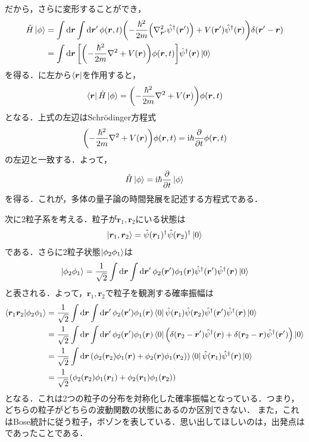 \documentclass{report}
\begin{document}
だから，さらに変形することができ，
\begin{align}
  \hat{H}\ket{\phi} &= \int \dd{\bm{r}} \int \dd{\bm{r}'} \phi(\bm{r},t) \qty(-\frac{\hbar^2}{2m}\qty(\nabla_{\bm{r}'}^2\hat{\psi}^{\dagger}(\bm{r}')) + V(\bm{r}')\hat{\psi}^{\dagger}(\bm{r}))\delta(\bm{r}' - \bm{r})\\
  &= \int \dd{\bm{r}} \qty[\qty(-\frac{\hbar^2}{2m}\nabla^2 + V(\bm{r}))\phi(\bm{r},t)]\hat{\psi}^{\dagger}(\bm{r})\ket{0} \label{integral-of-state}
\end{align}
を得る．に左から$\bra{\bm{r}}$を作用すると，
\begin{align}
  \bra{\bm{r}}\hat{H}\ket{\phi} = \qty(-\frac{\hbar^2}{2m}\nabla^2 + V(\bm{r}))\phi(\bm{r},t)
\end{align}
となる．上式の左辺はSchrödinger方程式
\begin{align}
  \qty(-\frac{\hbar^2}{2m}\nabla^2 + V(\bm{r}))\phi(\bm{r},t) = \mathrm{i}\hbar\frac{\partial}{\partial t}\phi(\bm{r},t)
\end{align}
の左辺と一致する．よって，
\begin{align}
  \hat{H} \ket{\phi} = \mathrm{i}\hbar\frac{\partial}{\partial t}\ket{\phi}
\end{align}
を得る．これが，多体の量子論の時間発展を記述する方程式である．

次に2粒子系を考える．粒子が$\bm{r}_1,\bm{r}_2$にいる状態は
\begin{align}
  \ket{\bm{r}_1,\bm{r}_2} = \hat{\psi}(\bm{r}_1)^{\dagger}\hat{\psi}(\bm{r}_2)^{\dagger}\ket{0}
\end{align}
である．さらに2粒子状態$\ket{\phi_2\phi_1}$は
\begin{align}
  \ket{\phi_2\phi_1} = \frac{1}{\sqrt{2}}\int\dd{\bm{r}}\int\dd{\bm{r}'} \phi_2(\bm{r}')\phi_1(\bm{r}) \hat{\psi}^{\dagger}(\bm{r}')\hat{\psi}^{\dagger}(\bm{r}) \ket{0}
\end{align}
と表される．よって，$\bm{r}_1,\bm{r}_2$で粒子を観測する確率振幅は
\begin{align}
  \bra{\bm{r}_1\bm{r}_2}\ket{\phi_2\phi_1} &= \frac{1}{\sqrt{2}}\int\dd{\bm{r}}\int\dd{\bm{r}'}\phi_2(\bm{r}')\phi_1(\bm{r})\bra{0}\hat{\psi}(\bm{r}_1)\hat{\psi}(\bm{r}_2)\hat{\psi}^{\dagger}(\bm{r}')\hat{\psi}^{\dagger}(\bm{r}) \ket{0}\\
  &= \frac{1}{\sqrt{2}}\int\dd{\bm{r}}\int\dd{\bm{r}'}\phi_2(\bm{r}')\phi_1(\bm{r})\bra{0}\qty(\delta(\bm{r}_2 - \bm{r}')\hat{\psi}^{\dagger}(\bm{r}) + \delta(\bm{r}_2 - \bm{r})\hat{\psi}^{\dagger}(\bm{r}')) \ket{0}\\
  &= \frac{1}{\sqrt{2}}\int\dd{\bm{r}}\qty(\phi_2(\bm{r}_2)\phi_1(\bm{r}) + \phi_2(\bm{r})\phi_1(\bm{r}_2))\bra{0}\hat{\psi}(\bm{r}_1)\hat{\psi}^{\dagger}(\bm{r})\ket{0}\\
  &= \frac{1}{\sqrt{2}}\qty(\phi_2(\bm{r}_2)\phi_1(\bm{r}_1) + \phi_2(\bm{r}_1)\phi_1(\bm{r}_2))
\end{align}
となる．これは2つの粒子の分布を対称化した確率振幅となっている．つまり，どちらの粒子がどちらの波動関数の状態にあるのか区別できない．
また，これはBose統計に従う粒子，ボゾンを表している．思い出してほしいのは，出発点はであったことである．
\end{document}
